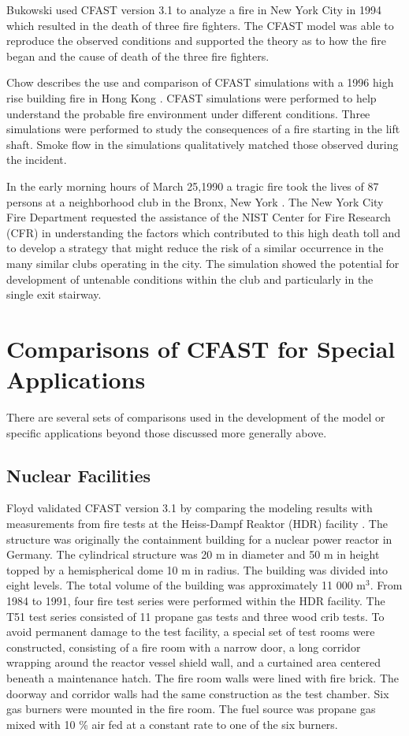 Bukowski used CFAST version 3.1 to analyze a fire in New York City \cite{Bukowski:1996} in 1994 which resulted in the death of three fire fighters. The CFAST model was able to reproduce the observed conditions and supported the theory as to how the fire began and the cause of death of the three fire fighters.

Chow describes the use and comparison of CFAST simulations with a 1996 high rise building fire in Hong Kong \cite{Chow:1996}. CFAST simulations were performed to help understand the probable fire environment under different conditions. Three simulations were performed to study the consequences of a fire starting in the lift shaft. Smoke flow in the simulations qualitatively matched those observed during the incident.

In the early morning hours of March 25,1990 a tragic fire took the lives of 87 persons at a neighborhood club in the Bronx, New York \cite{Bukowski:1992}. The New York City Fire Department requested the assistance of the NIST Center for Fire Research (CFR) in understanding the factors which contributed to this high death toll and to develop a strategy that might reduce the risk of a similar occurrence in the many similar clubs operating in the city. The simulation showed the potential for development of untenable conditions within the club and particularly in the single exit stairway.


\section{Comparisons of CFAST for Special Applications}

There are several sets of comparisons used in the development of the model or specific applications beyond those discussed more generally above.

\subsection{Nuclear Facilities}

Floyd validated CFAST version 3.1 by comparing the modeling results with measurements from fire tests at the Heiss-Dampf Reaktor (HDR) facility \cite{Floyd:2002}. The structure was originally the containment building for a nuclear power reactor in Germany. The cylindrical structure was 20 m in diameter and 50 m in height topped by a hemispherical dome 10 m in radius. The building was divided into eight levels. The total volume of the building was approximately 11 000 m$^3$. From 1984 to
1991, four fire test series were performed within the HDR facility. The T51 test series consisted of 11 propane gas tests and three wood crib tests. To avoid permanent damage to the test facility, a special set of test rooms were constructed, consisting of a fire room with a narrow door, a long corridor wrapping around the reactor vessel shield wall, and a curtained area centered beneath a maintenance hatch. The fire room walls were lined with fire brick. The doorway and corridor walls had the same construction as the test chamber. Six gas burners were mounted in the fire room. The fuel source was propane gas mixed with 10 \% air fed at a constant rate to one of the six burners.

